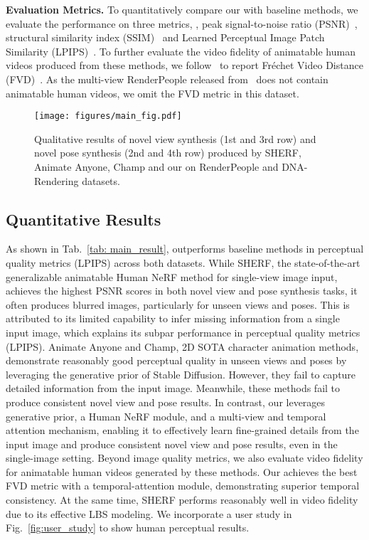 \noindent \textbf{Evaluation Metrics.}
To quantitatively compare our \nickname{} with baseline methods, we evaluate the performance on three metrics, \ie, peak signal-to-noise ratio (PSNR)~\cite{sara2019image}, structural similarity index (SSIM)~\cite{wang2004image} and Learned Perceptual Image Patch Similarity (LPIPS)~\cite{zhang2018unreasonable}.
To further evaluate the video fidelity of animatable human videos produced from these methods, we follow~\cite{shao2024360} to report Fréchet Video Distance (FVD)~\cite{unterthiner2018towards}.
As the multi-view RenderPeople released from~\cite{hu2023sherf} does not contain animatable human videos, we omit the FVD metric in this dataset.

\begin{figure*}[t]
    \centering
    \texttt{[image: figures/main\_fig.pdf]}
    \setlength{\abovecaptionskip}{0cm}
    \caption{Qualitative results of novel view synthesis (1st and 3rd row) and novel pose synthesis (2nd and 4th row) produced by SHERF, Animate Anyone, Champ and our \nickname{} on RenderPeople and DNA-Rendering datasets.} 
\label{fig: main_fig}
\vspace{-2mm}
\end{figure*}

\subsection{Quantitative Results}
As shown in Tab.~\ref{tab: main_result}, \nickname{} outperforms baseline methods in perceptual quality metrics (LPIPS) across both datasets.
While SHERF, the state-of-the-art generalizable animatable Human NeRF method for single-view image input, achieves the highest PSNR scores in both novel view and pose synthesis tasks, it often produces blurred images, particularly for unseen views and poses. 
This is attributed to its limited capability to infer missing information from a single input image, which explains its subpar performance in perceptual quality metrics (LPIPS).
Animate Anyone and Champ, 2D SOTA character animation methods, demonstrate reasonably good perceptual quality in unseen views and poses by leveraging the generative prior of Stable Diffusion.
However, they fail to capture detailed information from the input image.
Meanwhile, these methods fail to produce consistent novel view and pose results.
In contrast, our \nickname{} leverages generative prior, a Human NeRF module, and a multi-view and temporal attention mechanism, enabling it to effectively learn fine-grained details from the input image and produce consistent novel view 
and pose results, even in the single-image setting.
Beyond image quality metrics, we also evaluate video fidelity for animatable human videos generated by these methods. 
Our \nickname{} achieves the best FVD metric with a temporal-attention module, demonstrating superior temporal consistency. At the same time, SHERF performs reasonably well in video fidelity due to its effective LBS modeling.
We incorporate a user study in Fig.~\ref{fig:user_study} to show human perceptual results.


